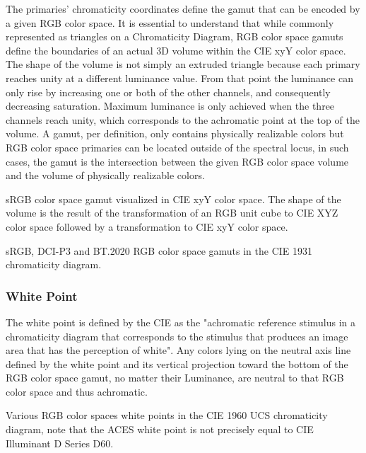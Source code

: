 The primaries' chromaticity coordinates define the gamut that can be encoded by a given RGB color space. It is essential to understand that while commonly represented as triangles on a Chromaticity Diagram, RGB color space gamuts define the boundaries of an actual 3D volume within the CIE xyY color space. The shape of the volume is not simply an extruded triangle because each primary reaches unity at a different luminance value. From that point the luminance can only rise by increasing one or both of the other channels, and consequently decreasing saturation. Maximum luminance is only achieved when the three channels reach unity, which corresponds to the achromatic point at the top of the volume.
A gamut, per definition, only contains physically realizable colors but RGB color space primaries can be located outside of the spectral locus, in such cases, the gamut is the intersection between the given RGB color space volume and the volume of physically realizable colors.

sRGB color space gamut visualized in CIE xyY color space. The shape of the volume is the result of the transformation of an RGB unit cube to CIE XYZ color space followed by a transformation to CIE xyY color space.


sRGB, DCI-P3 and BT.2020 RGB color space gamuts in the CIE 1931 chromaticity diagram.

\subsubsection{White Point}%
\label{subsubsec:white-point}

The white point is defined by the CIE as the "achromatic reference stimulus in a chromaticity diagram that corresponds to the stimulus that produces an image area that has the perception of white". Any colors lying on the neutral axis line defined by the white point and its vertical projection toward the bottom of the RGB color space gamut, no matter their Luminance, are neutral to that RGB color space and thus achromatic.

Various RGB color spaces white points in the CIE 1960 UCS chromaticity diagram, note that the ACES white point is not precisely equal to CIE Illuminant D Series D60.

